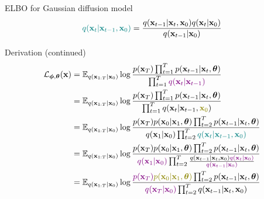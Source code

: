 \begin{frame}{ELBO for Gaussian diffusion model}
	\[
		 {\color{teal}q(\mathbf{x}_t | \mathbf{x}_{t-1}, \mathbf{x}_0)}  = \frac{q(\mathbf{x}_{t-1}|\mathbf{x}_t, \mathbf{x}_0)q(\mathbf{x}_{t} | \mathbf{x}_0)}{q(\mathbf{x}_{t-1}| \mathbf{x}_0)}
	\]
	\vspace{-0.3cm}
	\begin{block}{Derivation (continued)}
		\vspace{-0.6cm}
		{\small
		\begin{align*}
			\cL_{\bphi, \btheta}(\bx) & = \bbE_{q(\bx_{1:T} | \bx_0)} \log \frac{p(\bx_T) \prod_{t=1}^T p(\bx_{t-1} | \bx_t, \btheta) }{\prod_{t=1}^T {\color{violet}q(\bx_t | \bx_{t-1})}}  \\ 
			& = \bbE_{q(\bx_{1:T} | \bx_0)} \log \frac{p(\bx_T) \prod_{t=1}^T p(\bx_{t-1} | \bx_t, \btheta) }{\prod_{t=1}^T q(\bx_t | \bx_{t-1}, {\color{olive}\bx_0})}  \\ 
			& = \bbE_{q(\bx_{1:T} | \bx_0)} \log \frac{p(\bx_T) p(\bx_0 | \bx_1, \btheta) \prod_{t=2}^T p(\bx_{t-1} | \bx_t, \btheta) }{q(\bx_1 | \bx_0)\prod_{t=2}^T {\color{teal}q(\bx_t | \bx_{t-1}, \bx_0)}} \\
			& = \bbE_{q(\bx_{1:T} | \bx_0)} \log \frac{p(\bx_T) p(\bx_0 | \bx_1, \btheta) \prod_{t=2}^T p(\bx_{t-1} | \bx_t, \btheta) }{{\color{violet}q(\bx_1 | \bx_0)}\prod_{t=2}^T \frac{q(\bx_{t-1}|\bx_t, \bx_0) {\color{violet}q(\bx_{t} | \bx_0)}}{{\color{violet}q(\bx_{t-1}| \bx_0)}}} \\
			& = \bbE_{q(\bx_{1:T} | \bx_0)} \log \frac{{\color{violet}p(\bx_T)} {\color{olive}p(\bx_0 | \bx_1, \btheta)} \prod_{t=2}^T p(\bx_{t-1} | \bx_t, \btheta) }{{\color{violet}q(\bx_T | \bx_0)}\prod_{t=2}^T q(\bx_{t-1}|\bx_t, \bx_0)} 
		\end{align*}}
	\end{block}
	
\end{frame}
